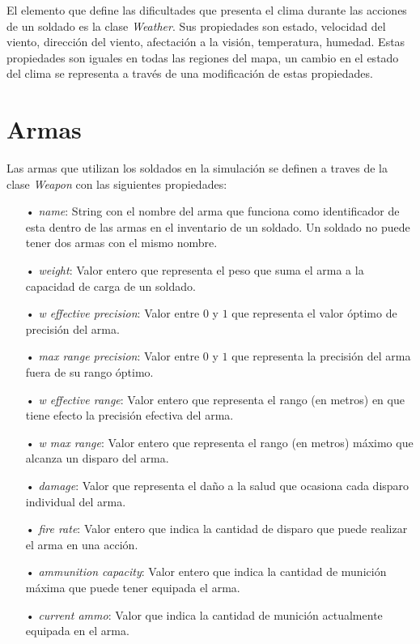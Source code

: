 \documentclass{llncs}
\begin{document}
El elemento que define las dificultades que presenta el clima durante las acciones de un soldado es la clase \emph{Weather}. Sus propiedades son estado, velocidad del viento, direcci\'on del viento, afectaci\'on a la visi\'on, temperatura, humedad. Estas propiedades son iguales en todas las regiones del mapa, un cambio en el estado del clima se representa a trav\'es de una modificaci\'on de estas propiedades.

\section{Armas}

Las armas que utilizan los soldados en la simulaci\'on se definen a traves de la clase \emph{Weapon} con las siguientes propiedades: 

\begin{itemize}
\item[•] \emph{name}: String con el nombre del arma que funciona como identificador de esta dentro de las armas en el inventario de un soldado. Un soldado no puede tener dos armas con el mismo nombre.
\item[•] \emph{weight}: Valor entero que representa el peso que suma el arma a la capacidad de carga de un soldado.
\item[•] \emph{w effective precision}: Valor entre $0$ y $1$ que representa el valor \'optimo de precisi\'on del arma.
\item[•] \emph{max range precision}: Valor entre $0$ y $1$ que representa la precisi\'on del arma fuera de su rango \'optimo.
\item[•] \emph{w effective range}: Valor entero que representa el rango (en metros) en que tiene efecto la precisi\'on efectiva del arma.
\item[•] \emph{w max range}: Valor entero que representa el rango (en metros) m\'aximo que alcanza un disparo del arma.
\item[•] \emph{damage}: Valor que representa el da\~no a la salud que ocasiona cada disparo individual del arma.
\item[•] \emph{fire rate}: Valor entero que indica la cantidad de disparo que puede realizar el arma en una acci\'on.
\item[•] \emph{ammunition capacity}: Valor entero que indica la cantidad de munici\'on m\'axima que puede tener equipada el arma.
\item[•] \emph{current ammo}: Valor que indica la cantidad de munici\'on actualmente equipada en el arma.

\end{itemize}
\end{document}
